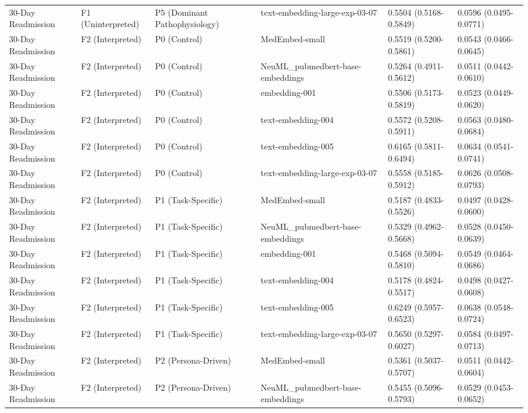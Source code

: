 \begin{tabular}{llllll}
30-Day Readmission & F1 (Uninterpreted) & P5 (Dominant Pathophysiology) & text-embedding-large-exp-03-07 & 0.5504 (0.5168-0.5849) & 0.0596 (0.0495-0.0771) \\
30-Day Readmission & F2 (Interpreted) & P0 (Control) & MedEmbed-small & 0.5519 (0.5200-0.5861) & 0.0543 (0.0466-0.0645) \\
30-Day Readmission & F2 (Interpreted) & P0 (Control) & NeuML\_pubmedbert-base-embeddings & 0.5264 (0.4911-0.5612) & 0.0511 (0.0442-0.0610) \\
30-Day Readmission & F2 (Interpreted) & P0 (Control) & embedding-001 & 0.5506 (0.5173-0.5819) & 0.0523 (0.0449-0.0620) \\
30-Day Readmission & F2 (Interpreted) & P0 (Control) & text-embedding-004 & 0.5572 (0.5208-0.5911) & 0.0563 (0.0480-0.0684) \\
30-Day Readmission & F2 (Interpreted) & P0 (Control) & text-embedding-005 & 0.6165 (0.5811-0.6494) & 0.0634 (0.0541-0.0741) \\
30-Day Readmission & F2 (Interpreted) & P0 (Control) & text-embedding-large-exp-03-07 & 0.5558 (0.5185-0.5912) & 0.0626 (0.0508-0.0793) \\
30-Day Readmission & F2 (Interpreted) & P1 (Task-Specific) & MedEmbed-small & 0.5187 (0.4833-0.5526) & 0.0497 (0.0428-0.0600) \\
30-Day Readmission & F2 (Interpreted) & P1 (Task-Specific) & NeuML\_pubmedbert-base-embeddings & 0.5329 (0.4962-0.5668) & 0.0528 (0.0450-0.0639) \\
30-Day Readmission & F2 (Interpreted) & P1 (Task-Specific) & embedding-001 & 0.5468 (0.5094-0.5810) & 0.0549 (0.0464-0.0686) \\
30-Day Readmission & F2 (Interpreted) & P1 (Task-Specific) & text-embedding-004 & 0.5178 (0.4824-0.5517) & 0.0498 (0.0427-0.0608) \\
30-Day Readmission & F2 (Interpreted) & P1 (Task-Specific) & text-embedding-005 & 0.6249 (0.5957-0.6523) & 0.0638 (0.0548-0.0724) \\
30-Day Readmission & F2 (Interpreted) & P1 (Task-Specific) & text-embedding-large-exp-03-07 & 0.5650 (0.5297-0.6027) & 0.0584 (0.0497-0.0713) \\
30-Day Readmission & F2 (Interpreted) & P2 (Persona-Driven) & MedEmbed-small & 0.5361 (0.5037-0.5707) & 0.0511 (0.0442-0.0604) \\
30-Day Readmission & F2 (Interpreted) & P2 (Persona-Driven) & NeuML\_pubmedbert-base-embeddings & 0.5455 (0.5096-0.5793) & 0.0529 (0.0453-0.0652) \\

\end{tabular}
